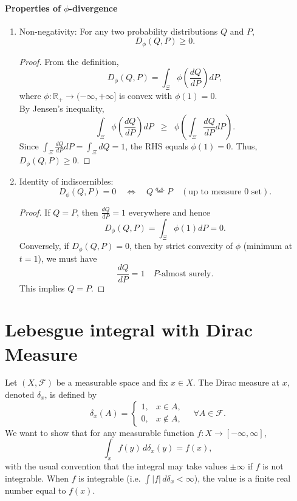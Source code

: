 \documentclass[11pt]{report}
\begin{document}
\subsubsection*{Properties of $\phi$-divergence}
\begin{enumerate}
\item Non-negativity:
    For any two probability distributions $Q$ and $P$,
    \[
        D_\phi(Q, P) \geq 0.
    \]
    \begin{proof}
    From the definition,
    \[
        D_\phi(Q, P) = \int_\Xi \phi\!\left(\frac{dQ}{dP}\right) dP,
    \]
    where $\phi : \mathbb{R}_+ \to (-\infty, +\infty]$ is convex with $\phi(1)=0$.\\
    By Jensen's inequality,
    \[
        \int_\Xi \phi\!\left(\frac{dQ}{dP}\right) dP \;\; \geq \;\; 
        \phi\!\left( \int_\Xi \frac{dQ}{dP} dP \right).
    \]
    Since $\int_\Xi \frac{dQ}{dP} dP = \int_\Xi dQ = 1$, the RHS equals $\phi(1)=0$.  
    Thus, $D_\phi(Q, P) \geq 0$.
    \end{proof}

\item Identity of indiscernibles:
    \[
        D_\phi(Q, P) = 0 \quad \iff \quad Q \overset{a.s.}= P \quad (\text{up to measure 0 set}).
    \]
    \begin{proof}
    If $Q = P$, then $\tfrac{dQ}{dP}=1$ everywhere and hence
    \[
        D_\phi(Q,P) = \int_\Xi \phi(1) dP = 0.
    \]
    Conversely, if $D_\phi(Q,P)=0$, then by strict convexity of $\phi$ (minimum at $t=1$), we must have
    \[
        \frac{dQ}{dP} = 1 \quad \text{$P$-almost surely}.
    \]
    This implies $Q=P$.
    \end{proof}
\end{enumerate}




\appendix
\chapter{Lebesgue integral with Dirac Measure}\label{adx1}
Let $(X,\mathcal{F})$ be a measurable space and fix $x \in X$.  
The Dirac measure at $x$, denoted $\delta_x$, is defined by
\[
\delta_x(A) =
\begin{cases}
1, & x \in A, \\
0, & x \notin A,
\end{cases}
\quad \forall A \in \mathcal{F}.
\]
We want to show that for any measurable function 
$f : X \to [-\infty,\infty]$,
\[
\int_{x} f(y) \, d\delta_x(y) = f(x),
\]
with the usual convention that the integral may take values $\pm \infty$ if $f$ is not integrable.  
When $f$ is integrable (i.e. $\int |f| \, d\delta_x < \infty$), the value is a finite real number equal to $f(x)$.
\end{document}

